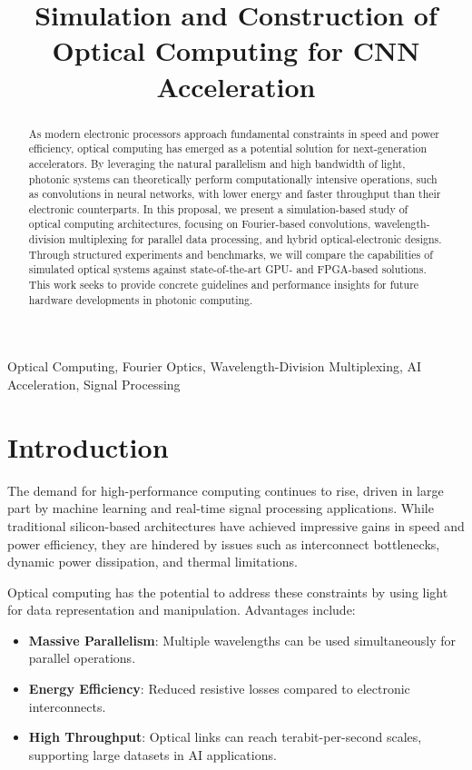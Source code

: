 \documentclass[conference]{IEEEtran}
\title{\textbf{Simulation and Construction of Optical Computing for CNN Acceleration}}
\author{
  \IEEEauthorblockN{Santiago Sosa, Marc DeCarlo}
  \IEEEauthorblockA{Department of Electrical and Computer Engineering\\ Drexel University\\
  Emails: {ss5427@drexel.edu, mad534@drexel.edu} }
}
\begin{document}
\maketitle

\begin{abstract}
As modern electronic processors approach fundamental constraints in speed and power efficiency, optical computing has emerged as a potential solution for next-generation accelerators. By leveraging the natural parallelism and high bandwidth of light, photonic systems can theoretically perform computationally intensive operations, such as convolutions in neural networks, with lower energy and faster throughput than their electronic counterparts. In this proposal, we present a simulation-based study of optical computing architectures, focusing on Fourier-based convolutions, wavelength-division multiplexing for parallel data processing, and hybrid optical-electronic designs. Through structured experiments and benchmarks, we will compare the capabilities of simulated optical systems against state-of-the-art GPU- and FPGA-based solutions. This work seeks to provide concrete guidelines and performance insights for future hardware developments in photonic computing.
\end{abstract}

\begin{IEEEkeywords}
Optical Computing, Fourier Optics, Wavelength-Division Multiplexing, AI Acceleration, Signal Processing
\end{IEEEkeywords}

\section{Introduction}
The demand for high-performance computing continues to rise, driven in large part by machine learning and real-time signal processing applications. While traditional silicon-based architectures have achieved impressive gains in speed and power efficiency, they are hindered by issues such as interconnect bottlenecks, dynamic power dissipation, and thermal limitations.

Optical computing has the potential to address these constraints by using light for data representation and manipulation. Advantages include:
\begin{itemize}
    \item \textbf{Massive Parallelism}: Multiple wavelengths can be used simultaneously for parallel operations.
    \item \textbf{Energy Efficiency}: Reduced resistive losses compared to electronic interconnects.
    \item \textbf{High Throughput}: Optical links can reach terabit-per-second scales, supporting large datasets in AI applications.
\end{itemize}
\end{document}
